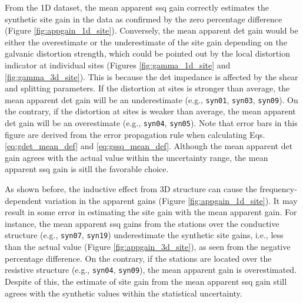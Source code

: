	From the 1D dataset, the mean apparent ssq gain correctly estimates the synthetic site gain in the data as confirmed by the zero percentage difference (Figure \ref{fig:appgain_1d_site}).
	Conversely, the mean apparent det gain would be either the overestimate or the underestimate of the site gain depending on the galvanic distortion strength, which could be pointed out by the local distortion indicator at individual sites (Figures \ref{fig:gamma_1d_site} and \ref{fig:gamma_3d_site}). This is because the det impedance is affected by the shear and splitting parameters.
	If the distortion at sites is stronger than average, the mean apparent det gain will be an underestimate (e.g., \texttt{syn01}, \texttt{syn03}, \texttt{syn09}). On the contrary, if the distortion at sites is weaker than average, the mean apparent det gain will be an overestimate (e.g., \texttt{syn04}, \texttt{syn05}).
	Note that error bars in this figure are derived from the error propagation rule when calculating Eqs. \eqref{eq:gdet_mean_def} and \eqref{eq:gssq_mean_def}.
	Although the mean apparent det gain agrees with the actual value within the uncertainty range, the mean apparent ssq gain is sitll the favorable choice.

As shown before, the inductive effect from 3D structure can cause the frequency-dependent variation in the apparent gains (Figure \ref{fig:appgain_1d_site}). It may result in some error in estimating the site gain with the mean apparent gain. 
For instance, the mean apparent ssq gains from the stations over the conductive structure (e.g., \texttt{syn07}, \texttt{syn19}) underestimate the synthetic site gains, i.e., less than the actual value (Figure \ref{fig:appgain_3d_site}), as seen from the negative percentage difference.
On the contrary, if the stations are located over the resistive structure (e.g., \texttt{syn04}, \texttt{syn09}), the mean apparent gain is overestimated.
%
Despite of this, the estimate of site gain from the mean apparent ssq gain still agrees with the synthetic values within the statistical uncertainty.
%

